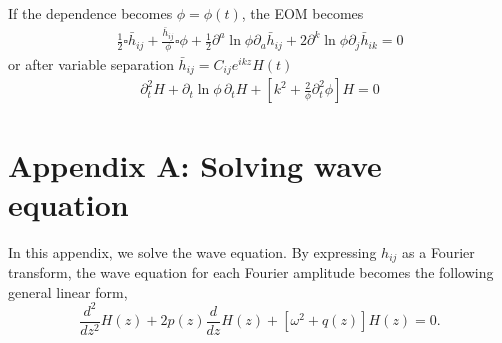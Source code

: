 \documentclass[
 jor,
 amsmath,amssymb,preprint,
]{revtex4-2}
\begin{document}
If the dependence becomes $\phi = \phi(t)$, the EOM becomes
\begin{equation}
\begin{aligned}
\frac{1}{2}\square \bar{h}_{ij} + \frac{\bar{h}_{ij}}{\phi}\square \phi + \frac{1}{2} \partial^a \ln\phi \partial_a\bar{h}_{ij} + 2\partial^k \ln\phi\partial_j \bar{h}_{ik} = 0
\end{aligned}
\end{equation}
or after variable separation $\bar{h}_{ij} = C_{ij}e^{ikz}H(t)$
\begin{equation}
\begin{aligned}
\partial_t^2H + \partial_t\ln\phi\,\partial_tH + \left[k^2 + \frac{2}{\phi}\partial_t^2 \phi\right] H = 0
\end{aligned}
\end{equation}
\begin{comment}
This, in terms of eq.\eqref{lapsol} with $y(t) = 2\partial_t^2\phi - \frac{1}{2}\partial_t^2\ln\phi = \frac{3}{2}\partial_t^2\ln\phi = -\frac{3}{2}\partial_t^2\ln G$, $g(t) = -\ln G$, also makes the forward GW having the following relation during propagation
\begin{equation}
\begin{aligned}
h^{(o)}_{ab}(\omega) = & \sqrt{\frac{G_o}{G_s}} \exp\bigg[ik t\frac{3\partial_t^2 \ln G_o}{4k^2} \bigg] h_{ab}^{(s)}(\omega) = \sqrt{\frac{G_o}{G_s}} \exp\bigg[i\omega t\frac{3\partial_t^2 \ln G_o}{4k^2} \bigg] h_{ab}^{(s)}(\omega)\,. \label{ehlapsol}
\end{aligned}
\end{equation}
The dispersion relations from the phase corrections are given by
\begin{align}
\omega = & k - \frac{ 4\nabla^2\ln G_o -\partial_z^2 \ln G_o}{4k} \quad \bigg( = k + \frac{ 3\nabla^2 \ln G_o}{4k}????? \bigg) \,, \\
\omega = & k + \frac{ 3\partial_t^2 \ln G_o}{4k} \,.
\end{align}
in eq.\eqref{ehsptsol} and eq.\eqref{ehlapsol} respectively. These dispersion relation gives rise to the derivate from light speed by
\begin{align}
|\nabla^2\ln G| < \frac{16\pi^2}{3} f^2 \Delta c\,, \\
|\partial_t^2\ln G| < \frac{16\pi^2}{3} f^2 \Delta c\,.
\end{align}
\end{comment}

\section{Appendix A: Solving wave equation}
\label{sec:appa}
In this appendix, we solve the wave equation. By expressing $h_{ij}$ as a Fourier transform, the
wave equation for each Fourier amplitude becomes the following general linear form,
\begin{equation}
    \frac{d^2}{d z^2}H(z)+2p(z)\frac{d}{d z}H(z)+\left[\omega^2+q(z)\right]H(z)=0.\label{dessoleq}
\end{equation}
\end{document}
